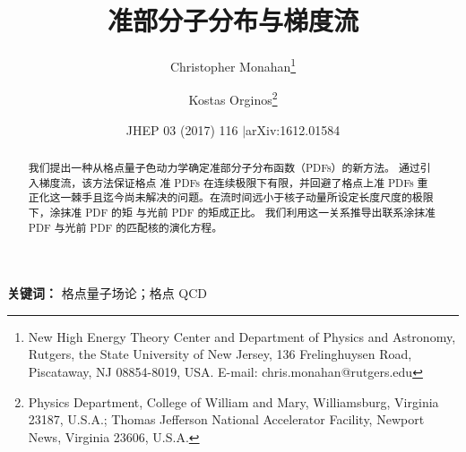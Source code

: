 \documentclass[11pt]{ctexart}
\title{准部分子分布与梯度流}
\author{Christopher Monahan\thanks{New High Energy Theory Center and Department of Physics and Astronomy, Rutgers, the State University of New Jersey, 136 Frelinghuysen Road, Piscataway, NJ 08854-8019, USA. E-mail: chris.monahan@rutgers.edu} \and Kostas Orginos\thanks{Physics Department, College of William and Mary, Williamsburg, Virginia 23187, U.S.A.; Thomas Jefferson National Accelerator Facility, Newport News, Virginia 23606, U.S.A.}}
\date{JHEP 03 (2017) 116 \quad$\vert$\quad arXiv:1612.01584}
\begin{document}
\maketitle

\begin{abstract}
我们提出一种从格点量子色动力学确定准部分子分布函数（PDFs）的新方法。
通过引入梯度流，该方法保证格点
准 PDFs 在连续极限下有限，并回避了格点上准 PDFs 重正化这一棘手且迄今尚未解决的问题。在流时间远小于核子动量所设定长度尺度的极限下，涂抹准 PDF 的矩
与光前 PDF 的矩成正比。
我们利用这一关系推导出联系涂抹准 PDF 与光前 PDF 的匹配核的演化方程。
\end{abstract}

\noindent\textbf{关键词：} 格点量子场论；格点 QCD







\end{document}
